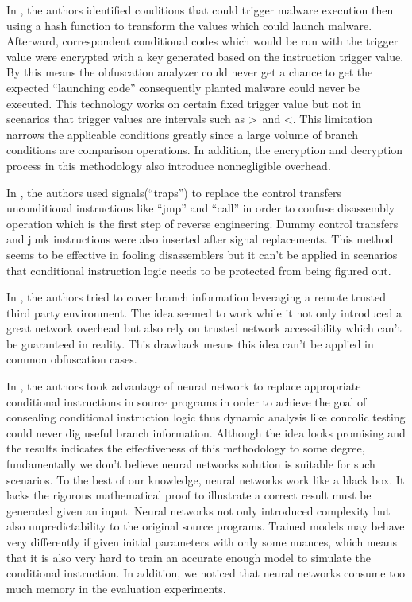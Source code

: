 \documentclass[lnicst]{svmultln}
\begin{document}
In \cite{Sharif}, the authors identified conditions that could trigger malware execution then using a hash function to transform the values which could launch malware. Afterward, correspondent conditional codes which would be run with the trigger value were encrypted with a key generated based on the instruction trigger value.
By this means the obfuscation analyzer could never get a chance to get the expected ``launching code'' consequently planted malware could never be executed. This technology works on certain fixed trigger value but not in scenarios that trigger values are intervals such as \textgreater \   and  \textless. This limitation narrows the applicable conditions greatly since a large volume of branch conditions are comparison operations. In addition, the encryption and decryption process in this methodology also introduce nonnegligible overhead.

In \cite{Popov}, the authors used signals(``traps'') to replace the control transfers unconditional instructions like ``jmp'' and ``call'' in order to confuse disassembly operation which is the first step of reverse engineering. Dummy control transfers and junk instructions were also inserted after signal replacements. This method seems to be effective in fooling disassemblers but it can't be applied in scenarios that conditional instruction logic needs to be protected from being figured out.

In \cite{Zhi}, the authors tried to cover branch information leveraging a remote trusted third party environment. The idea seemed to work while it not only introduced a great network overhead but also rely on trusted network accessibility which can't be guaranteed in reality. This drawback means this idea can't be applied in common obfuscation cases.

In \cite{Ma}, the authors took advantage of neural network to replace appropriate conditional instructions in source programs in order to achieve the goal of consealing conditional instruction logic thus dynamic analysis like concolic testing could never dig useful branch information. Although the idea looks promising and the results indicates the effectiveness of this methodology to some degree, fundamentally we don't believe neural networks solution is suitable for such scenarios. To the best of our knowledge,
neural networks work like a black box. It lacks the rigorous mathematical proof to illustrate a correct result must be generated given an input. Neural networks not only introduced complexity but also unpredictability to the original source programs. Trained models may behave very differently if given initial parameters with only some nuances, which means that it is also very hard to train an accurate enough model to simulate the conditional instruction. In addition, we noticed that neural networks consume too much memory in the evaluation experiments.
\end{document}
